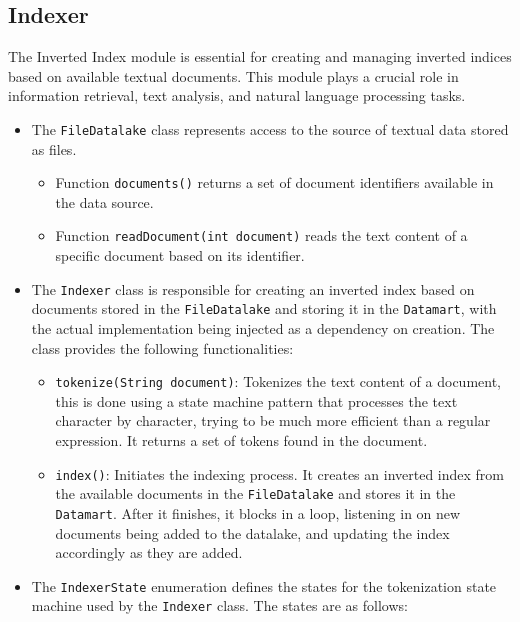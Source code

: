 \documentclass{article}
\begin{document}
\subsection{Indexer}

The Inverted Index module is essential for creating and managing inverted indices based on available textual documents. This module plays a crucial role in information retrieval, text analysis, and natural language processing tasks.

\begin{itemize}
\item
The \texttt{FileDatalake} class represents access to the source of textual data stored as files. 
\begin{itemize}
\item Function \texttt{documents()} returns a set of document identifiers available in the data source.
\item  Function \texttt{readDocument(int document)} reads the text content of a specific document based on its identifier.
\end{itemize}

\item
The \texttt{Indexer} class is responsible for creating an inverted index based on documents stored in the \texttt{FileDatalake} and storing it in the \texttt{Datamart}, with the actual implementation being injected as a dependency on creation. The class provides the following functionalities:

\begin{itemize}
  \item \texttt{tokenize(String document)}: Tokenizes the text content of a document, this is done using a state machine pattern that processes the text character by character, trying to be much more efficient than a regular expression.
		It returns a set of tokens found in the document.
  \item \texttt{index()}: Initiates the indexing process. It creates an inverted index from the available documents in the \texttt{FileDatalake} and stores it in the \texttt{Datamart}.
		After it finishes, it blocks in a loop, listening in on new documents being added to the datalake, and updating the index accordingly as they are added.
\end{itemize}

\item 
The \texttt{IndexerState} enumeration defines the states for the tokenization state machine used by the \texttt{Indexer} class. The states are as follows:


\end{itemize}
\end{document}
